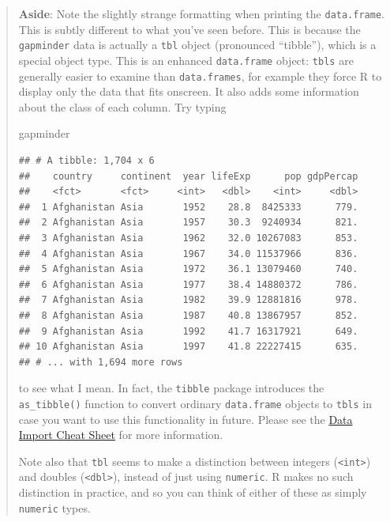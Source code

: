 \documentclass[]{book}
\newenvironment{Shaded}{\begin{snugshade}}{\end{snugshade}}
\newcommand{\NormalTok}[1]{{#1}}
\theoremstyle{definition}
\theoremstyle{definition}
\theoremstyle{definition}
\theoremstyle{remark}
\begin{document}
\begin{quote}
\textbf{Aside}: Note the slightly strange formatting when printing the
\texttt{data.frame}. This is subtly different to what you've seen
before. This is because the \texttt{gapminder} data is actually a
\texttt{tbl} object (pronounced ``tibble''), which is a special object
type. This is an enhanced \texttt{data.frame} object: \texttt{tbls} are
generally easier to examine than \texttt{data.frames}, for example they
force R to display only the data that fits onscreen. It also adds some
information about the class of each column. Try typing

\begin{Shaded}
\begin{Highlighting}[]
\NormalTok{gapminder}
\end{Highlighting}
\end{Shaded}

\begin{verbatim}
## # A tibble: 1,704 x 6
##    country     continent  year lifeExp      pop gdpPercap
##    <fct>       <fct>     <int>   <dbl>    <int>     <dbl>
##  1 Afghanistan Asia       1952    28.8  8425333      779.
##  2 Afghanistan Asia       1957    30.3  9240934      821.
##  3 Afghanistan Asia       1962    32.0 10267083      853.
##  4 Afghanistan Asia       1967    34.0 11537966      836.
##  5 Afghanistan Asia       1972    36.1 13079460      740.
##  6 Afghanistan Asia       1977    38.4 14880372      786.
##  7 Afghanistan Asia       1982    39.9 12881816      978.
##  8 Afghanistan Asia       1987    40.8 13867957      852.
##  9 Afghanistan Asia       1992    41.7 16317921      649.
## 10 Afghanistan Asia       1997    41.8 22227415      635.
## # ... with 1,694 more rows
\end{verbatim}

to see what I mean. In fact, the \texttt{tibble} package introduces the
\texttt{as\_tibble()} function to convert ordinary \texttt{data.frame}
objects to \texttt{tbls} in case you want to use this functionality in
future. Please see the
\href{https://github.com/rstudio/cheatsheets/raw/master/source/pdfs/data-import-cheatsheet.pdf}{Data
Import Cheat Sheet} for more information.

Note also that \texttt{tbl} seems to make a distinction between integers
(\texttt{\textless{}int\textgreater{}}) and doubles
(\texttt{\textless{}dbl\textgreater{}}), instead of just using
\texttt{numeric}. R makes no such distinction in practice, and so you
can think of either of these as simply \texttt{numeric} types.
\end{quote}
\end{document}
